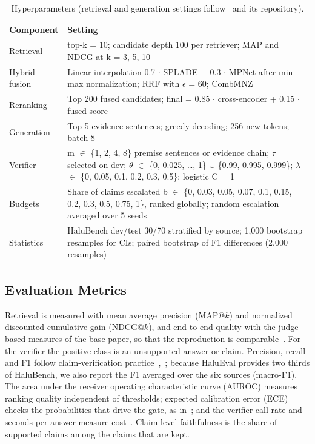 \documentclass[conference]{IEEEtran}
\begin{document}
\begin{table}[t]
\centering
\caption{Hyperparameters (retrieval and generation settings follow~\cite{mala_ml} and its repository).}
\label{tab:t4}
\footnotesize
\setlength{\tabcolsep}{3pt}
\renewcommand{\arraystretch}{1.12}
\begin{tabularx}{\columnwidth}{>{\raggedright\arraybackslash\hsize=0.591\hsize}X>{\raggedright\arraybackslash\hsize=1.409\hsize}X}
\toprule
\textbf{Component} & \textbf{Setting} \\
\midrule
Retrieval & top-k = 10; candidate depth 100 per retriever; MAP and NDCG at k = 3, 5, 10 \\
Hybrid fusion & Linear interpolation 0.7 $\cdot$ SPLADE + 0.3 $\cdot$ MPNet after min--max normalization; RRF with $\epsilon$ = 60; CombMNZ \\
Reranking & Top 200 fused candidates; final = 0.85 $\cdot$ cross-encoder + 0.15 $\cdot$ fused score \\
Generation & Top-5 evidence sentences; greedy decoding; 256 new tokens; batch 8 \\
Verifier & m $\in$ \{1, 2, 4, 8\} premise sentences or evidence chain; $\tau$ selected on dev; $\theta$ $\in$ \{0, 0.025, \ldots{}, 1\} $\cup$ \{0.99, 0.995, 0.999\}; $\lambda$ $\in$ \{0, 0.05, 0.1, 0.2, 0.3, 0.5\}; logistic C = 1 \\
Budgets & Share of claims escalated b $\in$ \{0, 0.03, 0.05, 0.07, 0.1, 0.15, 0.2, 0.3, 0.5, 0.75, 1\}, ranked globally; random escalation averaged over 5 seeds \\
Statistics & HaluBench dev/test 30/70 stratified by source; 1,000 bootstrap resamples for CIs; paired bootstrap of F1 differences (2,000 resamples) \\
\bottomrule
\end{tabularx}
\end{table}

\subsection{Evaluation Metrics}

Retrieval is measured with mean average precision (MAP@$k$) and normalized discounted cumulative gain (NDCG@$k$), and end-to-end quality with the judge-based measures of the base paper, so that the reproduction is comparable~\cite{mala_ml}. For the verifier the positive class is an unsupported answer or claim. Precision, recall and F1 follow claim-verification practice~\cite{rahman_air},~\cite{naser_lre}; because HaluEval provides two thirds of HaluBench, we also report the F1 averaged over the six sources (macro-F1). The area under the receiver operating characteristic curve (AUROC) measures ranking quality independent of thresholds; expected calibration error (ECE) checks the probabilities that drive the gate, as in~\cite{pal_dai}; and the verifier call rate and seconds per answer measure cost~\cite{cheng_tois}. Claim-level faithfulness is the share of supported claims among the claims that are kept.
\end{document}
